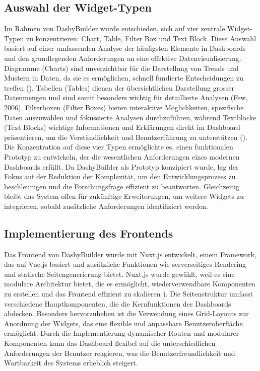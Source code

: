 \documentclass[a4paper, 12pt]{scrartcl}
\begin{document}
\subsection{Auswahl der Widget-Typen}
Im Rahmen von DashyBuilder wurde entschieden, sich auf vier zentrale Widget-Typen zu konzentrieren: Chart, Table, Filter Box und Text Block. Diese Auswahl basiert auf einer umfassenden Analyse der häufigsten Elemente in Dashboards und den grundlegenden Anforderungen an eine effektive Datenvisualisierung. Diagramme (Charts) sind unverzichtbar für die Darstellung von Trends und Mustern in Daten, da sie es ermöglichen, schnell fundierte Entscheidungen zu treffen (\cite[S.119]{Dibia2023}). Tabellen (Tables) dienen der übersichtlichen Darstellung grosser Datenmengen und sind somit besonders wichtig für detaillierte Analysen (Few, 2006). Filterboxen (Filter Boxes) bieten interaktive Möglichkeiten, spezifische Daten auszuwählen und fokussierte Analysen durchzuführen, während Textblöcke (Text Blocks) wichtige Informationen und Erklärungen direkt im Dashboard präsentieren, um die Verständlichkeit und Benutzerführung zu unterstützen (\cite[S.119]{Dibia2023}). Die Konzentration auf diese vier Typen ermöglichte es, einen funktionalen Prototyp zu entwickeln, der die wesentlichen Anforderungen eines modernen Dashboards erfüllt. Da DashyBuilder als Prototyp konzipiert wurde, lag der Fokus auf der Reduktion der Komplexität, um den Entwicklungsprozess zu beschleunigen und die Forschungsfrage effizient zu beantworten. Gleichzeitig bleibt das System offen für zukünftige Erweiterungen, um weitere Widgets zu integrieren, sobald zusätzliche Anforderungen identifiziert werden.

\subsection{Implementierung des Frontends}
Das Frontend von DashyBuilder wurde mit Nuxt.js entwickelt, einem Framework, das auf Vue.js basiert und zusätzliche Funktionen wie serverseitiges Rendering und statische Seitengenerierung bietet. Nuxt.js wurde gewählt, weil es eine modulare Architektur bietet, die es ermöglicht, wiederverwendbare Komponenten zu erstellen und das Frontend effizient zu skalieren \cite[S.119]{Dibia2023}). Die Seitenstruktur umfasst verschiedene Hauptkomponenten, die die Kernfunktionen des Dashboards abdecken. Besonders hervorzuheben ist die Verwendung eines Grid-Layouts zur Anordnung der Widgets, das eine flexible und anpassbare Benutzeroberfläche ermöglicht. Durch die Implementierung dynamischer Routen und modularer Komponenten kann das Dashboard flexibel auf die unterschiedlichen Anforderungen der Benutzer reagieren, was die Benutzerfreundlichkeit und Wartbarkeit des Systems erheblich steigert.
\end{document}
